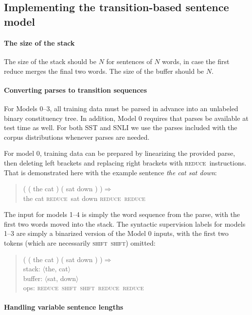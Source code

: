 \documentclass[11pt,letterpaper]{article}
\newcommand{\shift}{\textsc{shift}}
\newcommand{\reduce}{\textsc{reduce}}
\def\ii#1{\textit{#1}}
\begin{document}
\subsection{Implementing the transition-based sentence model}

\paragraph{The size of the stack}
The size of the stack should be $N$ for sentences of $N$ words, in case the first reduce merges the final two words. The size of the buffer should be $N$.

\paragraph{Converting parses to transition sequences}

For Models 0--3, all training data must be parsed in advance into an unlabeled binary constituency tree. In addition, Model 0 requires that  parses be available at test time as well. For both SST and SNLI we use the parses included with the corpus distributions whenever parses are needed. 

For model 0, training data can be prepared by linearizing the provided parse, then deleting left brackets and replacing right brackets with \reduce~instructions. That is demonstrated here with the example sentence \ii{the cat sat down}:

\begin{quote}\small
( ( the cat ) ( sat down ) )$\Rightarrow$\\
the cat \reduce~sat down \reduce~\reduce
\end{quote}

The input for models 1--4 is simply the word sequence from the parse, with the first two words moved into the stack. The syntactic supervision labels for models 1--3 are simply a binarized version of the Model 0 inputs, with the first two tokens (which are necessarily \shift~\shift) omitted: 

\begin{quote}\small
( ( the cat ) ( sat down ) )$\Rightarrow$ \\
stack: $\langle$the, cat$\rangle$\\
buffer: $\langle$sat, down$\rangle$\\
ops: \reduce~\shift~\shift~\reduce~\reduce
\end{quote}

\paragraph{Handling variable sentence lengths}
\end{document}
